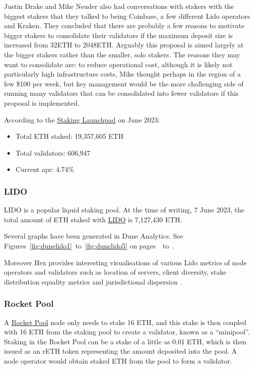 \documentclass[UTF8]{article}
\begin{document}
Justin Drake and Mike Neuder also had conversations with stakers with the biggest stakers that they talked to being Coinbase, a few different Lido operators and Kraken. They concluded that there are probably a few reasons to motivate bigger stakers to consolidate their validators if the maximum deposit size is increased from 32ETH to 2048ETH. Arguably this proposal is aimed largely at the bigger stakers rather than the smaller, solo stakers. The reasons they may want to consolidate are: to reduce operational cost, although it is likely not particularly high infrastructure costs, Mike thought perhaps in the region of a few \$100 per week, but key management would be the more challenging side of running many validators that can be consolidated into fewer validators if this proposal is implemented. 

According to the \href{https://launchpad.ethereum.org/en/}{Staking Launchpad} on June 2023:
\begin{itemize}
\item Total ETH staked: 19,357,605 ETH
\item Total validators: 606,947
\item Current \gls{apr}: 4.74\%
\end{itemize}

\subsubsection*{LIDO}
LIDO is a popular liquid staking pool. 
At the time of writing, 7 June 2023, the total amount of ETH staked with \href{https://lido.fi/ethereum}{LIDO}  is 7,127,430 ETH. 

Several graphs have been generated in Dune Analytics. See Figures~\ref{fig:dunelido1}~to~\ref{fig:dunelido5} on pages~\pageref{fig:dunelido1}~to~\pageref{fig:dunelido5}.

Moreover Hex provides interesting visualisations of various Lido metrics of node operators and validators such as location of servers, client diversity, stake distribution equality metrics
 and jurisdictional dispersion \cite{lidodoc}. 

\subsubsection*{Rocket Pool}
A \href{https://rocketpool.net/}{Rocket Pool} node only needs to stake 16 ETH, and this stake is then coupled with 16 ETH from the staking pool to create a validator, known as a ``minipool''.  Staking in the Rocket Pool can be a stake of a little as 0.01 ETH, which is then issued as an rETH token representing the amount deposited into the pool. A node operator would obtain staked ETH from the pool to form a validator.
\end{document}
